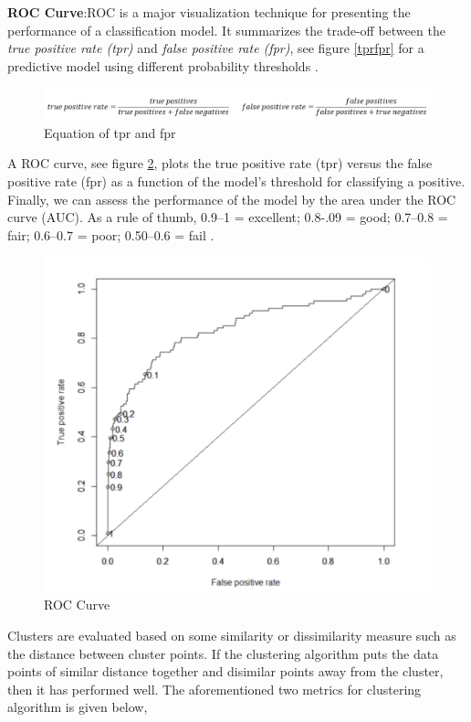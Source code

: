 \documentclass[format=sigconf]{acmart}
\begin{document}
\textbf{ROC Curve}:ROC is a major visualization technique for presenting the performance of a classification model. 
It summarizes the trade-off between the \textit{true positive rate (tpr)} and \textit{false positive rate (fpr)}, see figure \ref{tprfpr} 
for a predictive model using different probability thresholds \cite{confusionmatrix}.
\begin{figure}[H]
    \centering
    \includegraphics[scale=0.18]{images/tpr_fpr_equation.png}
    \caption{Equation of tpr and fpr}
    \label{fig:tprfpr}
\end{figure}
A ROC curve, see figure \ref{fig:roc}, plots the true positive rate (tpr) versus the false positive rate (fpr) as a function of the 
model’s threshold for classifying a positive. Finally, we can assess the performance of the model by the area under the ROC 
curve (AUC). As a rule of thumb, 0.9–1 = excellent; 0.8-.09 = good; 0.7–0.8 = fair; 0.6–0.7 = poor; 0.50–0.6 = fail 
\cite{confusionmatrix}.
\begin{figure}[H]
    \centering
    \includegraphics[scale=0.25]{images/AUC_ROC_Curve.png}
    \caption{ROC Curve}
    \label{fig:roc}
\end{figure}
Clusters are evaluated based on some similarity or dissimilarity measure such as the distance between cluster points. 
If the clustering algorithm puts the data points of similar distance together and disimilar points away from the cluster, 
then it has performed well. The aforementioned two metrics for clustering algorithm is given below,
\end{document}
